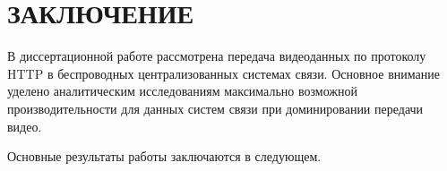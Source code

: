 \chapter*{ЗАКЛЮЧЕНИЕ}						%


В диссертационной работе рассмотрена передача видеоданных по протоколу HTTP в беспроводных централизованных системах связи. Основное внимание уделено аналитическим исследованиям максимально возможной производительности для данных систем связи при доминировании передачи видео.

Основные результаты работы заключаются в следующем.

